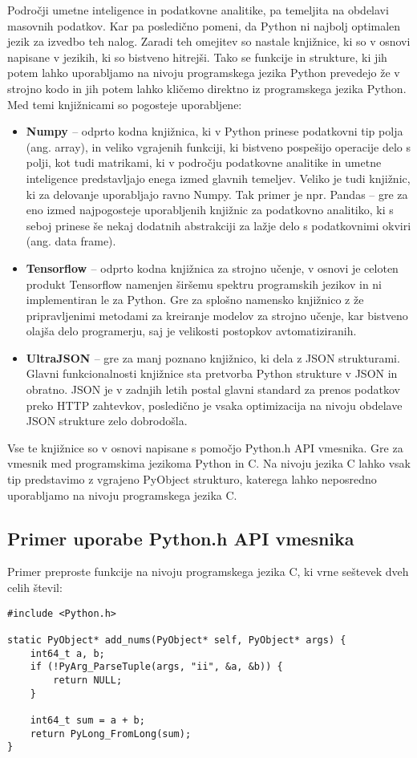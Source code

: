 \documentclass[a4paper,12pt,openright]{book}
\begin{document}
    Področji umetne inteligence in podatkovne analitike, pa temeljita na obdelavi masovnih podatkov. Kar pa posledično pomeni, da Python ni najbolj optimalen jezik za izvedbo teh nalog. Zaradi teh omejitev so nastale knjižnice, ki so v osnovi napisane v jezikih, ki so bistveno hitrejši. Tako se funkcije in strukture, ki jih potem lahko uporabljamo na nivoju programskega jezika Python prevedejo že v strojno kodo in jih potem lahko kličemo direktno iz programskega jezika Python. Med temi knjižnicami so pogosteje uporabljene:
    \begin{itemize}
        \item \textbf{Numpy \cite{NUMPY_GITHUB}} – odprto kodna knjižnica, ki v Python prinese podatkovni tip polja (ang. array), in veliko vgrajenih funkciji, ki bistveno pospešijo operacije delo s polji, kot tudi matrikami, ki v področju podatkovne analitike in umetne inteligence predstavljajo enega izmed glavnih temeljev. Veliko je tudi knjižnic, ki za delovanje uporabljajo ravno Numpy. Tak primer je npr. Pandas \cite{PANDAS_GITHUB} – gre za eno izmed najpogosteje uporabljenih knjižnic za podatkovno analitiko, ki s seboj prinese še nekaj dodatnih abstrakciji za lažje delo s podatkovnimi okviri (ang. data frame).
        \item \textbf{Tensorflow \cite{TENSORFLOW_GITHUB}} –  odprto kodna knjižnica za strojno učenje, v osnovi je celoten produkt Tensorflow namenjen širšemu spektru programskih jezikov in ni implementiran le za Python. Gre za splošno namensko knjižnico z že pripravljenimi metodami za kreiranje modelov za strojno učenje, kar bistveno olajša delo programerju, saj je velikosti postopkov avtomatiziranih.
        \item \textbf{UltraJSON \cite{UJSON_GITHUB}} – gre za manj poznano knjižnico, ki dela z JSON strukturami. Glavni funkcionalnosti knjižnice sta pretvorba Python strukture v JSON in obratno. JSON je v zadnjih letih postal glavni standard za prenos podatkov preko HTTP zahtevkov, posledično je vsaka optimizacija na nivoju obdelave JSON strukture zelo dobrodošla. 
    \end{itemize}

    \noindent
    Vse te knjižnice so v osnovi napisane s pomočjo Python.h API vmesnika. Gre za vmesnik med programskima jezikoma Python in C. Na nivoju jezika C lahko vsak tip predstavimo z vgrajeno PyObject strukturo, katerega lahko neposredno uporabljamo na nivoju programskega jezika C. 

    \newpage
    \subsection{Primer uporabe Python.h API vmesnika}
    Primer preproste funkcije na nivoju programskega jezika C, ki vrne seštevek dveh celih števil:
\begin{verbatim}
#include <Python.h>

static PyObject* add_nums(PyObject* self, PyObject* args) {
    int64_t a, b;
    if (!PyArg_ParseTuple(args, "ii", &a, &b)) {
        return NULL;
    }

    int64_t sum = a + b;
    return PyLong_FromLong(sum);
}
\end{verbatim}
\end{document}
